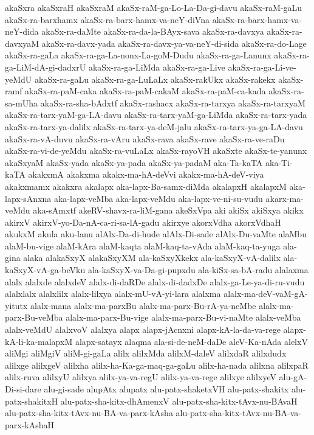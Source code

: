 {akaSxra
akaSxraH
akaSxraM
akaSx-raM-ga-Lo-La-Da-gi-davu
akaSx-raM-gaLu
akaSx-ra-barxhamx
akaSx-ra-barx-hamx-va-neY-diVna
akaSx-ra-barx-hamx-va-neY-dida
akaSx-ra-daMte
akaSx-ra-da-la-BAyx-sava
akaSx-ra-davxya
akaSx-ra-davxyaM
akaSx-ra-davx-yada
akaSx-ra-davx-ya-va-neY-di-sida
akaSx-ra-do-Lage
akaSx-ra-gaLa
akaSx-ra-ga-La-nonx-La-goM-Dudu
akaSx-ra-ga-Lanunx
akaSx-ra-ga-LiM-dA-gi-dadxrU
akaSx-ra-ga-LiMda
akaSx-ra-ga-Live
akaSx-ra-ga-Li-ve-yeMdU
akaSx-ra-gaLu
akaSx-ra-ga-LuLaLx
akaSx-rakUkx
akaSx-rakekx
akaSx-ramf
akaSx-ra-paM-caka
akaSx-ra-paM-cakaM
akaSx-ra-paM-ca-kada
akaSx-ra-sa-mUha
akaSx-ra-sha-bAdxtf
akaSx-rashacx
akaSx-ra-tarxya
akaSx-ra-tarxyaM
akaSx-ra-tarx-yaM-ga-LA-davu
akaSx-ra-tarx-yaM-ga-LiMda
akaSx-ra-tarx-yada
akaSx-ra-tarx-ya-dalilx
akaSx-ra-tarx-ya-deM-jalu
akaSx-ra-tarx-ya-ga-LA-davu
akaSx-ra-vA-duvu
akaSx-ra-vAru
akaSx-rava
akaSx-rave
akaSx-ra-ve-raDu
akaSx-ra-vi-de-yeMdu
akaSx-ra-vuLaLx
akaSx-rayoVH
akaSxte
akaSx-te-yanunx
akaSxyaM
akaSx-yada
akaSx-ya-pada
akaSx-ya-padaM
aka-Ta-kaTA
aka-Ti-kaTA
akakxmA
akakxma
akakx-ma-hA-deVvi
akakx-ma-hA-deV-viya
akakxmamx
akakxra
akalapx
aka-lapx-Ba-samx-diMda
akalapxH
akalapxM
aka-lapx-sAnxna
aka-lapx-veMba
aka-lapx-veMdu
aka-lapx-ve-ni-su-vudu
akarx-ma-veMdu
aka-sAmxtf
akeRV-shavx-ra-liM-gana
akeSxVpa
aki
akiSx
akiSxya
akikx
akirxV
akirxV-yo-Da-nA-ca-ri-sa-lA-gadu
akirxye
akorxVdha
akorxVdhaH
akukxM
akula
aku-lanu
alAlx-Da-di-hude
alAlx-Di-sade
alAlx-Du-vaMte
alaMbu
alaM-bu-vige
alaM-kAra
alaM-kaqta
alaM-kaq-ta-vAda
alaM-kaq-ta-yuga
ala-gina
alaka
alakaSxyX
alakaSxyXM
ala-kaSxyXkekx
ala-kaSxyX-vA-dalilx
ala-kaSxyX-vA-ga-beVku
ala-kaSxyX-va-Da-gi-pupxdu
ala-kiSx-sa-bA-radu
alalaxma
alalx
alalxde
alalxdeV
alalx-di-daRDe
alalx-di-dadxDe
alalx-ga-Le-ya-di-ru-vudu
alalxlalx
alalxlilx
alalx-lilxya
alalx-mU-vA-yi-lara
alalxma
alalx-ma-deV-vaM-gA-yitutx
alalx-mana
alalx-ma-parxBu
alalx-ma-parx-Bu-rA-ya-neMbe
alalx-ma-parx-Bu-veMba
alalx-ma-parx-Bu-vige
alalx-ma-parx-Bu-vi-naMte
alalx-veMba
alalx-veMdU
alalxvoV
alalxya
alapx
alapx-jAcnxni
alapx-kA-la-da-va-rege
alapx-kA-li-ka-malapxM
alapx-satayx
alaqma
ala-si-de-neM-daDe
aleV-Ka-nAda
alelxV
aliMgi
aliMgiV
aliM-gi-gaLa
alilx
alilxMda
alilxM-daleV
alilxdaR
alilxdudx
alilxge
alilxgeV
alilxha
alilx-ha-Ka-ga-maq-ga-gaLu
alilx-ha-nada
alilxna
alilxpaR
alilx-ruva
alilxyU
alilxya
alilx-ya-va-regU
alilx-ya-va-rege
alilxye
alilxyeV
alu-gA-Di-si-dare
alu-gi-sade
alupAtx
alupatx
alu-patx-shaketxVH
alu-patx-shakitx
alu-patx-shakitxH
alu-patx-sha-kitx-dhAmenxV
alu-patx-sha-kitx-tAvx-nu-BAvaH
alu-patx-sha-kitx-tAvx-nu-BA-va-parx-kAsha
alu-patx-sha-kitx-tAvx-nu-BA-va-parx-kAshaH
}
